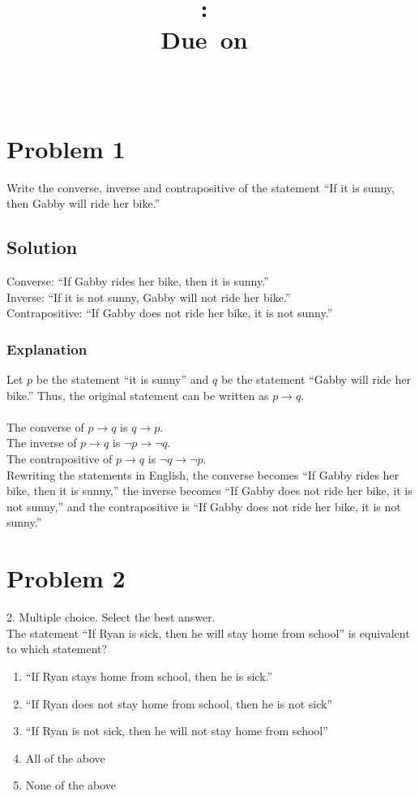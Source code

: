 \documentclass[table]{article}
\title{
    \vspace{2in}
    \textmd{\textbf{\hmwkClass:\ \hmwkTitle}}\\
    \normalsize\vspace{0.1in}\small{Due\ on\ \hmwkDueDate}\\
    \vspace{0.1in}\large{\textit{\hmwkClassInstructor\ \hmwkClassTime}}
    \vspace{3in}
}
\author{\hmwkAuthorName}
\date{}
\begin{document}
\maketitle
\pagebreak
\section{Problem 1}
Write the converse, inverse and contrapositive of the statement ``If it is sunny, then Gabby
will ride her bike.''
\subsection{Solution}
Converse: ``If Gabby rides her bike, then it is sunny.''\\
Inverse: ``If it is not sunny, Gabby will not ride her bike.''\\
Contrapositive: ``If Gabby does not ride her bike, it is not sunny.''
\subsubsection{Explanation}
Let $p$ be the statement ``it is sunny'' and $q$ be the statement ``Gabby will ride her bike.'' Thus, the original statement can be written as $p \rightarrow q$.\\~\\
The converse of $p \rightarrow q$ is $q \rightarrow p$.\\
The inverse of $p \rightarrow q$ is $\neg p \rightarrow \neg q$.\\
The contrapositive of $p \rightarrow q$ is $\neg q \rightarrow \neg p$.\\
Rewriting the statements in English, the converse becomes ``If Gabby rides her bike, then it is sunny,'' the inverse becomes ``If Gabby does not ride her bike, it is not sunny,'' and the contrapositive is ``If Gabby does not ride her bike, it is not sunny.''
\section{Problem 2}
2. Multiple choice. Select the best answer.\\
The statement ``If Ryan is sick, then he will stay home from school'' is equivalent to which
statement?
\begin{enumerate}[nosep,label=\alph*)]
\item ``If Ryan stays home from school, then he is sick.''
\item ``If Ryan does not stay home from school, then he is not sick''
\item ``If Ryan is not sick, then he will not stay home from school''
\item All of the above
\item None of the above
\end{enumerate}
\end{document}
